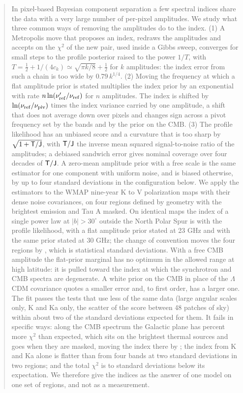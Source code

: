 \begin{abstract}
\noindent
In pixel-based Bayesian component separation a few spectral indices share the data with a very large
number of per-pixel amplitudes. We study what three common ways of removing the amplitudes do to
the index. (1) A Metropolis move that proposes an index, redraws the amplitudes and accepts on the
$\chi^2$ of the new pair, used inside a Gibbs sweep, converges for small steps to the profile
posterior raised to the power $1/T$, with $T = \tfrac12 + 1/(4c_k) \simeq \sqrt{\pi k/8} + \tfrac12$
for $k$ amplitudes: the index error from such a chain is too wide by $0.79\,k^{1/4}$. (2) Moving the
frequency at which a flat amplitude prior is stated multiplies the index prior by an exponential
with rate $n\ln(\nu_{\rm ref}'/\nu_{\rm ref})$ for $n$ amplitudes. The index is shifted by
$\ln(\nu_{\rm ref}/\nu_{\rm piv})$ times the index variance carried by one amplitude, a shift that
does not average down over pixels and changes sign across a pivot frequency set by the bands and by
the prior on the CMB. (3) The profile likelihood has an unbiased score and a curvature that is too
sharp by $\sqrt{1+\Tm/\J}$, with $\Tm/\J$ the inverse mean squared signal-to-noise ratio of the
amplitudes; a debiased sandwich error gives nominal coverage over four decades of $\Tm/\J$. A
zero-mean amplitude prior with a free scale is the same estimator for one component with uniform
noise, and is biased otherwise, by up to four standard deviations in the configuration below.
We apply the estimators to the WMAP nine-year K to V polarization maps with their dense noise
covariances, on four regions defined by geometry with the brightest emission and Tau A masked. On
identical maps the index of a single power law at $|b| > 30^\circ$ outside the North Polar Spur is
 with the profile likelihood,  with a flat amplitude prior stated at 23 GHz
and  with the same prior stated at 30 GHz; the change of convention moves the four
regions by , which is  statistical standard deviations. With a
free CMB amplitude the flat-prior marginal has no optimum in the allowed range at high latitude:
it is pulled toward the index at which the synchrotron and CMB spectra are degenerate. A white prior
on the CMB in place of the $\Lambda$CDM covariance quotes a smaller error and, to first order, has a
larger one. The fit passes the tests that use less of the same data (large angular scales only, K and
Ka only, the scatter of the score between 48 patches of sky) within about two of the standard
deviations expected for them. It fails in specific ways: along the CMB spectrum the Galactic plane
has  percent more $\chi^2$ than expected, which sits on the brightest thermal
sources and goes when they are masked, moving the index there by ; the index from K and
Ka alone is flatter than from four bands at two standard deviations in two regions; and the total
$\chi^2$ is  to  standard deviations below its
expectation. We therefore give the indices as the answer of one model on one set of regions, and not
as a measurement.
\end{abstract}
